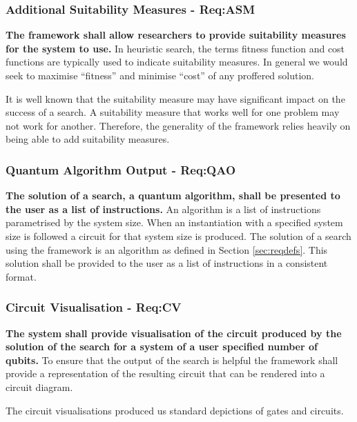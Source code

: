 \subsubsection{Additional Suitability Measures - Req:ASM}
\label{sec:reqasm}
\textbf{The framework shall allow researchers to provide suitability measures for the system to use.}
In heuristic search, the terms fitness function and cost functions are typically used to indicate suitability measures.
In general we would seek to maximise ``fitness'' and minimise ``cost'' of any proffered solution.

It is well known that the suitability measure may have significant impact on the success of a search.
A suitability measure that works well for one problem may not work for another. 
Therefore, the generality of the framework relies heavily on being able to add suitability measures.

\subsubsection{Quantum Algorithm Output - Req:QAO}
\label{sec:reqqao}
\textbf{The solution of a search, a quantum algorithm, shall be presented to the user as a list of instructions.}
An algorithm is a list of instructions parametrised by the system size.
When an instantiation with a specified system size is followed a circuit for that system size is produced.
The solution of a search using the framework is an algorithm as defined in Section \ref{sec:reqdefs}.
This solution shall be provided to the user as a list of instructions in a consistent format.

\subsubsection{Circuit Visualisation  - Req:CV}
\label{sec:reqcv}
\textbf{The system shall provide visualisation of the circuit produced by the solution of the search for a system of a user specified number of qubits.}
To ensure that the output of the search is helpful the framework shall provide a representation of the resulting circuit that can be rendered into a circuit diagram.

The circuit visualisations produced us standard depictions of gates and circuits.

